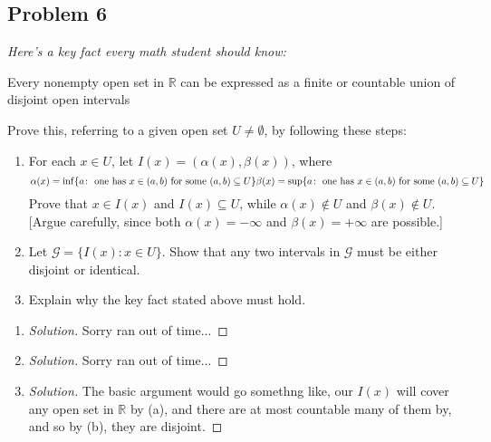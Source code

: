 \documentclass{article}
\newcommand{\R}{{\mathbb R}}
\begin{document}
\subsection*{Problem 6}
{\it Here's a key fact every math student should know:
\begin{center}
	Every nonempty open set in $\R$ can be expressed
	as a finite or countable union of disjoint open intervals
\end{center}
Prove this, referring to a given open set $U \neq \emptyset$, by following these steps:
\begin{enumerate}
	\item For each $x \in U$, let $I(x) = (\alpha(x),\beta(x))$, where
	\[
		\alpha(x) = \inf\{a \colon \text{ one has }x\in(a,b) \text{ for some }(a,b)\subseteq U\}\\
		\beta(x) = \sup\{a \colon \text{ one has }x\in(a,b) \text{ for some }(a,b)\subseteq U\}
	\]
	Prove that $x \in I(x)$ and $I(x) \subseteq U$,
	while $\alpha(x) \not\in U$ and $\beta(x) \not\in U$.
	[Argue carefully, since both $\alpha(x) = -\infty$ and $\beta(x) = +\infty$ are possible.]
	\item Let $\mathcal{G} = \{I(x) \colon x \in U\}$.
		Show that any two intervals in $\mathcal{G}$ must be either disjoint or identical.
	\item Explain why the key fact stated above must hold.
\end{enumerate}}

\begin{enumerate}
	\item \begin{proof}[Solution]\let\qed\relax
		Sorry ran out of time...
	\end{proof}
	\item \begin{proof}[Solution]\let\qed\relax
		Sorry ran out of time...
	\end{proof}
	\item \begin{proof}[Solution]\let\qed\relax
		The basic argument would go somethng like,
		our $I(x)$ will cover any open set in $\R$ by (a),
		and there are at most countable many of them by,
		and so by (b), they are disjoint.
	\end{proof}
\end{enumerate}
\clearpage
~\clearpage
\end{document}
